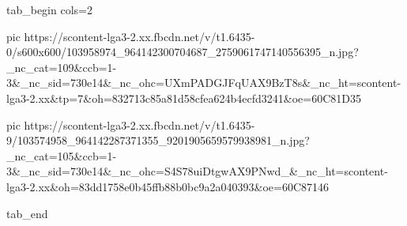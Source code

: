 \ifcmt
  tab_begin cols=2

     pic https://scontent-lga3-2.xx.fbcdn.net/v/t1.6435-0/s600x600/103958974_964142300704687_2759061747140556395_n.jpg?_nc_cat=109&ccb=1-3&_nc_sid=730e14&_nc_ohc=UXmPADGJFqUAX9BzT8s&_nc_ht=scontent-lga3-2.xx&tp=7&oh=832713c85a81d58cfea624b4ecfd3241&oe=60C81D35

     pic https://scontent-lga3-2.xx.fbcdn.net/v/t1.6435-9/103574958_964142287371355_9201905659579938981_n.jpg?_nc_cat=105&ccb=1-3&_nc_sid=730e14&_nc_ohc=S4S78uiDtgwAX9PNwd_&_nc_ht=scontent-lga3-2.xx&oh=83dd1758e0b45ffb88b0bc9a2a040393&oe=60C87146

  tab_end
\fi

